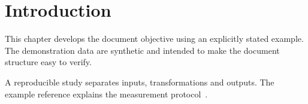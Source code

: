 \section{Introduction}


\label{sec:chapter1}
This chapter develops the document objective using an explicitly stated example. The demonstration data are synthetic and intended to make the document structure easy to verify.

A reproducible study separates inputs, transformations and outputs. The example reference explains the measurement protocol~\cite{example}.
